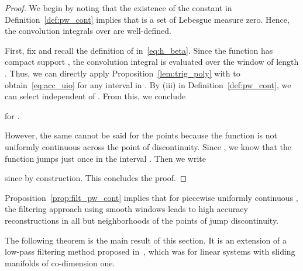 \documentclass[times, doublespace]{rncauth}
\begin{document}
\begin{proof}
	We begin by noting that the existence of the constant  in Definition~\ref{def:pw_cont} implies that  is a set of Lebesgue measure zero. Hence, the convolution integrals over  are well-defined.
	
	First, fix  and recall the definition of  in~\eqref{eq:h_beta}. Since the function  has compact support , the convolution integral is evaluated over the window of length . Thus, we can directly apply Proposition~\ref{lem:trig_poly} with  to obtain~\eqref{eq:acc_uio} for any interval in . By (iii) in Definition~\ref{def:pw_cont}, we can select  independent of . From this, we conclude
	
	for .
	
	However, the same cannot be said for the points  because the function  is not uniformly continuous across the point of discontinuity. Since , we know that the function jumps just once in the interval . Then we write
	
	since  by construction. This concludes the proof.
\end{proof}
Proposition~\ref{prop:filt_pw_cont} implies that for piecewise uniformly continuous , the filtering approach using smooth windows leads to high accuracy reconstructions in all but neighborhoods of the points of jump discontinuity.

The following theorem is the main result of this section. It is an extension of a low-pass filtering method proposed in~\cite{Hui2013}, which was for linear systems with sliding manifolds of co-dimension one. 
\end{document}
